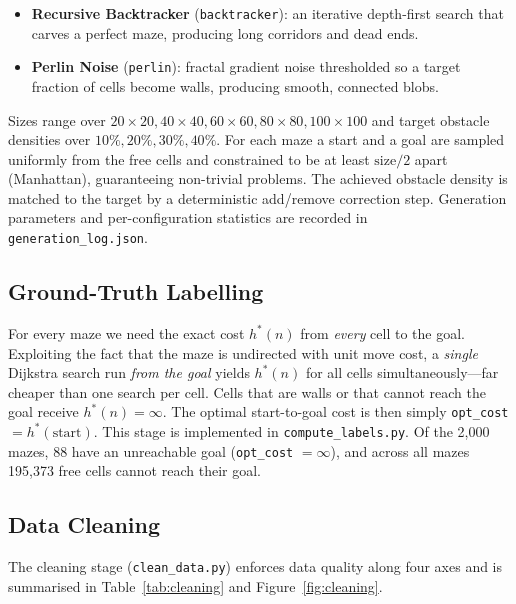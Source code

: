 \documentclass[11pt]{article}
\begin{document}
\begin{itemize}
  \item \textbf{Recursive Backtracker} (\texttt{backtracker}): an iterative depth-first
  search that carves a perfect maze, producing long corridors and dead ends.
  \item \textbf{Perlin Noise} (\texttt{perlin}): fractal gradient noise thresholded so a
  target fraction of cells become walls, producing smooth, connected blobs.
\end{itemize}

Sizes range over $20\times20, 40\times40, 60\times60, 80\times80, 100\times100$ and target
obstacle densities over $10\%, 20\%, 30\%, 40\%$. For each maze a start and a goal are
sampled uniformly from the free cells and constrained to be at least $\text{size}/2$
apart (Manhattan), guaranteeing non-trivial problems. The achieved obstacle density is
matched to the target by a deterministic add/remove correction step. Generation
parameters and per-configuration statistics are recorded in
\texttt{generation\_log.json}.

\subsection{Ground-Truth Labelling}
\label{sec:labels}
For every maze we need the exact cost $h^\ast(n)$ from \emph{every} cell to the goal.
Exploiting the fact that the maze is undirected with unit move cost, a \emph{single}
Dijkstra search run \emph{from the goal} yields $h^\ast(n)$ for all cells
simultaneously---far cheaper than one search per cell. Cells that are walls or that cannot
reach the goal receive $h^\ast(n)=\infty$. The optimal start-to-goal cost is then simply
\texttt{opt\_cost} $= h^\ast(\text{start})$. This stage is implemented in
\texttt{compute\_labels.py}. Of the 2{,}000 mazes, 88 have an unreachable goal
(\texttt{opt\_cost} $=\infty$), and across all mazes 195{,}373 free cells cannot reach
their goal.

\subsection{Data Cleaning}
\label{sec:cleaning}
The cleaning stage (\texttt{clean\_data.py}) enforces data quality along four axes and is
summarised in Table~\ref{tab:cleaning} and Figure~\ref{fig:cleaning}.
\end{document}
